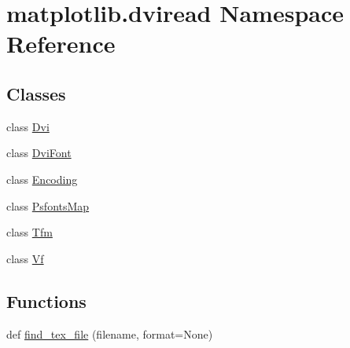 \hypertarget{namespacematplotlib_1_1dviread}{}\section{matplotlib.\+dviread Namespace Reference}
\label{namespacematplotlib_1_1dviread}
\subsection*{Classes}
\begin{DoxyCompactItemize}
\item 
class \hyperlink{classmatplotlib_1_1dviread_1_1Dvi}{Dvi}
\item 
class \hyperlink{classmatplotlib_1_1dviread_1_1DviFont}{Dvi\+Font}
\item 
class \hyperlink{classmatplotlib_1_1dviread_1_1Encoding}{Encoding}
\item 
class \hyperlink{classmatplotlib_1_1dviread_1_1PsfontsMap}{Psfonts\+Map}
\item 
class \hyperlink{classmatplotlib_1_1dviread_1_1Tfm}{Tfm}
\item 
class \hyperlink{classmatplotlib_1_1dviread_1_1Vf}{Vf}
\end{DoxyCompactItemize}
\subsection*{Functions}
\begin{DoxyCompactItemize}
\item 
def \hyperlink{namespacematplotlib_1_1dviread_aded8f21bc8468b8fd589146ccf72ffce}{find\+\_\+tex\+\_\+file} (filename, format=None)
\end{DoxyCompactItemize}
